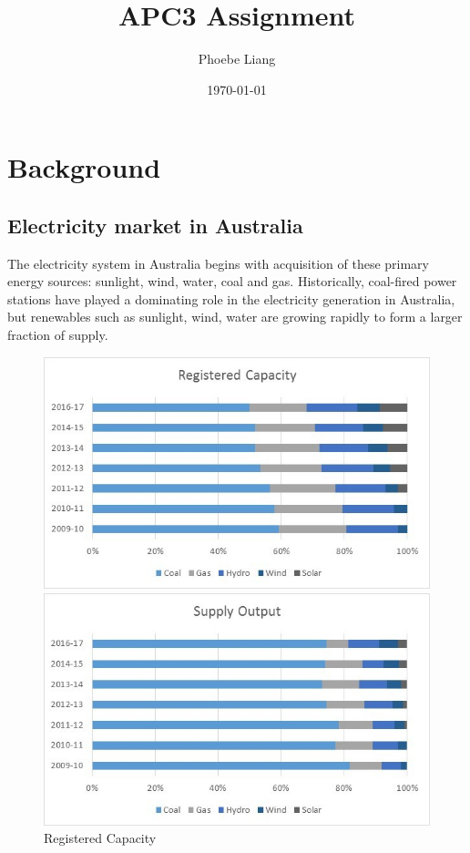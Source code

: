 \documentclass[12pt]{article}
\title{APC3 Assignment}
\author{Phoebe Liang}
\date{\today}
\begin{document}
\maketitle

\tableofcontents
\clearpage

\section{Background}
\subsection{Electricity market in Australia}
\begin{flushleft}
The electricity system in Australia begins with acquisition of these primary energy sources: sunlight, wind, water, coal and gas.\parencite{aemc1} Historically, coal-fired power stations have played a dominating role in the electricity generation in Australia, but renewables such as sunlight, wind, water are growing rapidly to form a larger fraction of supply.\parencite{aer1} \par
\begin{figure}[!h]
  \centering
  \begin{minipage}[b]{0.45\textwidth}
    \includegraphics[width=\textwidth]{Registered_capacity.jpg}
    \caption{Registered Capacity}
  \end{minipage}
  \hfill
  \begin{minipage}[b]{0.45\textwidth}
    \includegraphics[width=\textwidth]{supply_output.jpg}

\end{minipage}
\end{figure}
\end{flushleft}
\end{document}
